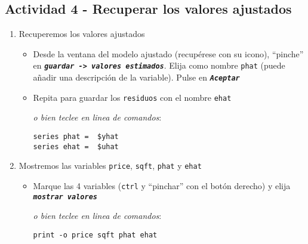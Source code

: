 \documentclass[11pt]{article}
\begin{document}
\subsection{Actividad 4 - Recuperar los valores ajustados}
\label{sec:orgfd6352e}
\begin{enumerate}
\item Recuperemos los valores ajustados
\label{sec:org7f2a2a4}
\begin{itemize}
\item Desde la ventana del modelo ajustado (recupérese con su icono),
``pinche'' en \textbf{\emph{\texttt{guardar -> valores estimados}}}. Elija como nombre
\texttt{phat} (puede añadir una descripción de la variable). Pulse en
\textbf{\emph{\texttt{Aceptar}}}
\item Repita para guardar los \texttt{residuos} con el nombre \texttt{ehat}

{\vspace{1pt} \footnotesize \color{gray!70!black}
\emph{o bien teclee en linea de comandos}:
\begin{verbatim}
series phat =  $yhat
series ehat =  $uhat
\end{verbatim}
}
\end{itemize}

\item Mostremos las variables \texttt{price}, \texttt{sqft}, \texttt{phat} y \texttt{ehat}
\label{sec:orgf60eddc}
\begin{itemize}
\item Marque las 4 variables (\texttt{ctrl} y ``pinchar'' con el botón derecho) y elija
\textbf{\emph{\texttt{mostrar valores}}}

{\vspace{1pt} \footnotesize \color{gray!70!black}
\emph{o bien teclee en linea de comandos}: 
\begin{verbatim}
print -o price sqft phat ehat
\end{verbatim}
}
\end{itemize}
\end{enumerate}
\end{document}
